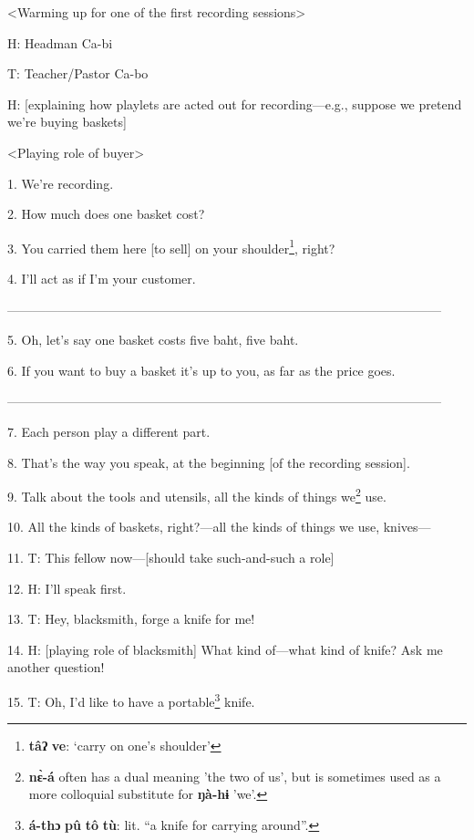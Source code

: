 \setcounter{footnote}{0}

<Warming up for one of the first recording sessions>

H: Headman Ca-bi

T: Teacher/Pastor Ca-bo

H: [explaining how playlets are acted out for recording---e.g., suppose we pretend
we're buying baskets]

<Playing role of buyer>

1. We're recording.

2. How much does one basket cost?

3. You carried them here [to sell] on your shoulder\footnote{\textbf{tâʔ} \textbf{ve}: `carry on one's shoulder'}, right?

4. I'll act as if I'm your customer.

------------------------------------------------------------------------------------------------------


5. Oh, let's say one basket costs five baht, five baht.

6. If you want to buy a basket it's up to you, as far as the price goes.

------------------------------------------------------------------------------------------------------

7. Each person play a different part.

8. That's the way you speak, at the beginning [of the recording session].

9. Talk about the tools and utensils, all the kinds of things we\footnote{\textbf{nɛ̀-á} often has a dual meaning 'the two of us', but is sometimes used as a more colloquial substitute for \textbf{ŋà-hɨ} 'we'.} use.

10. All the kinds of baskets, right?---all the kinds of things we use, knives---

11. T: This fellow now---[should take such-and-such a role]

12. H: I'll speak first.

13. T: Hey, blacksmith, forge a knife for me!

14. H: [playing role of blacksmith] What kind of---what kind of knife? 
Ask me another question!

15. T: Oh, I'd like to have a portable\footnote{\textbf{á-thɔ} \textbf{pû} \textbf{tô} \textbf{tù}: lit. ``a knife for carrying around''.} knife.

